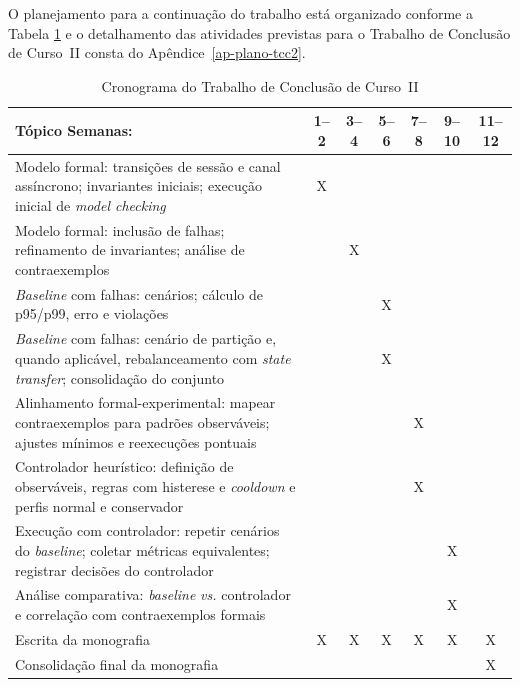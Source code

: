 O planejamento para a continuação do trabalho está organizado conforme a Tabela \ref{tab-cronograma-tcc2} e o detalhamento das atividades previstas para o Trabalho de Conclusão de Curso~II consta do Apêndice~\ref{ap-plano-tcc2}. 
\begin{table}[!h]
\captionsetup{type=table, name=Tabela}
\caption{Cronograma do Trabalho de Conclusão de Curso~II}
\centering
\small
\begin{tabular}{p{8cm}cccccc}
\hline
\textbf{Tópico} \hspace{5cm}\textbf{Semanas:} & \textbf{1--2} & \textbf{3--4} & \textbf{5--6} & \textbf{7--8} & \textbf{9--10} & \textbf{11--12} \\
\hline
Modelo formal: transições de sessão e canal assíncrono; invariantes iniciais; execução inicial de \emph{model checking} & X &  &  &  &  &  \\
Modelo formal: inclusão de falhas; refinamento de invariantes; análise de contraexemplos &  & X &  &  &  &  \\
\emph{Baseline} com falhas: cenários; cálculo de p95/p99, erro e violações &  &  & X &  &  &  \\
\emph{Baseline} com falhas: cenário de partição e, quando aplicável, rebalanceamento com \emph{state transfer}; consolidação do conjunto &  &  & X &  &  &  \\
Alinhamento formal-experimental: mapear contraexemplos para padrões observáveis; ajustes mínimos e reexecuções pontuais &  &  &  & X &  &  \\
Controlador heurístico: definição de observáveis, regras com histerese e \emph{cooldown} e perfis normal e conservador &  &  &  & X &  &  \\
Execução com controlador: repetir cenários do \emph{baseline}; coletar métricas equivalentes; registrar decisões do controlador &  &  &  &  & X &  \\
Análise comparativa: \emph{baseline} \emph{vs.} controlador e correlação com contraexemplos formais &  &  &  &  & X &  \\
Escrita da monografia & X & X & X & X & X & X \\
Consolidação final da monografia &  &  &  &  &  & X \\
\hline
\end{tabular}
\label{tab-cronograma-tcc2}
\end{table}

